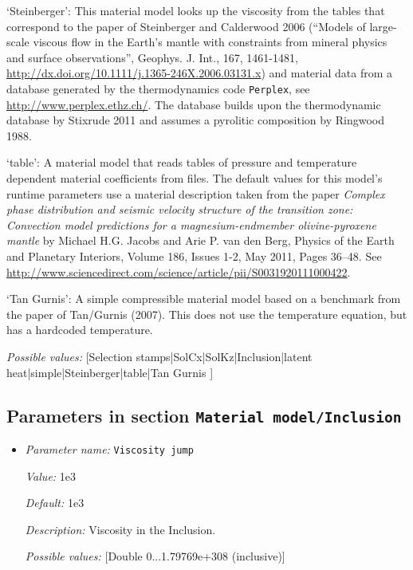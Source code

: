 \begin{itemize}
`Steinberger': This material model looks up the viscosity from the tables that correspond to the paper of Steinberger and Calderwood 2006 (``Models of large-scale viscous flow in the Earth's mantle with constraints from mineral physics and surface observations'', Geophys. J. Int., 167, 1461-1481, \url{http://dx.doi.org/10.1111/j.1365-246X.2006.03131.x}) and material data from a database generated by the thermodynamics code \texttt{Perplex}, see \url{http://www.perplex.ethz.ch/}. The database builds upon the thermodynamic database by Stixrude 2011 and assumes a pyrolitic composition by Ringwood 1988. 

`table': A material model that reads tables of pressure and temperature dependent material coefficients from files. The default values for this model's runtime parameters use a material description taken from the paper \textit{Complex phase distribution and seismic velocity structure of the transition zone: Convection model predictions for a magnesium-endmember olivine-pyroxene mantle} by Michael H.G. Jacobs and Arie P. van den Berg, Physics of the Earth and Planetary Interiors, Volume 186, Issues 1-2, May 2011, Pages 36--48. See \url{http://www.sciencedirect.com/science/article/pii/S0031920111000422}.

`Tan Gurnis': A simple compressible material model based on a benchmark from the paper of Tan/Gurnis (2007). This does not use the temperature equation, but has a hardcoded temperature.


{\it Possible values:} [Selection stamps|SolCx|SolKz|Inclusion|latent heat|simple|Steinberger|table|Tan Gurnis ]
\end{itemize}



\subsection{Parameters in section \tt Material model/Inclusion}
\label{parameters:Material_20model/Inclusion}

\begin{itemize}
\item {\it Parameter name:} {\tt Viscosity jump}


{\it Value:} 1e3


{\it Default:} 1e3


{\it Description:} Viscosity in the Inclusion.


{\it Possible values:} [Double 0...1.79769e+308 (inclusive)]
\end{itemize}

